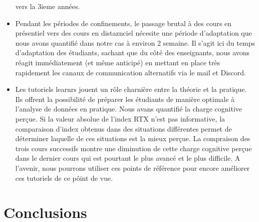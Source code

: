 \documentclass[
]{article}
\begin{document}
\begin{itemize}
  vers la 3ieme années.
\item
  Pendant les périodes de confinements, le passage brutal à des cours en
  présentiel vers des cours en distaznciel nécesite une période
  d'adaptation que nous avons quantifié dans notre cas à environ 2
  semaine. Il s'agit ici du temps d'adaptation des étudiants, sachant
  que du côté des enseignants, nous avons réagit immédiatement (et même
  anticipé) en mettant en place très rapidement les canaux de
  communication alternatifs via le mail et Discord.
\item
  Les tutoriels learnrs jouent un rôle charnière entre la théorie et la
  pratique. Ils offrent la possibilité de préparer les étudiants de
  manière optimale à l'analyse de données en pratique. Nous avans
  quantifié la charge cognitive perçue. Si la valeur absolue de l'index
  RTX n'est pas informative, la comparaison d'index obtenus dans des
  situations différentes permet de déterminer laquelle de ces situations
  est la mieux perçue. La compraison des trois cours successifs montre
  une diminution de cette charge cognitive perçue dans le dernier cours
  qui est pourtant le plus avancé et le plus difficile. A l'avenir, nous
  pourrons utiliser ces points de référence pour encore améliorer ces
  tutoriels de ce pôint de vue.
\end{itemize}

\hypertarget{conclusions}{%
\section{Conclusions}\label{conclusions}}
\end{document}
